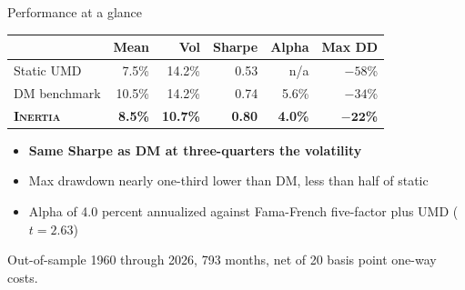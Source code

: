 \documentclass[aspectratio=169, 11pt]{beamer}
\newcommand{\fundname}{\textsc{Inertia}}
\newcommand{\emphb}[1]{{\color{inertiablue}\textbf{#1}}}
\begin{document}
\begin{frame}{Performance at a glance}
  \vspace{18pt}
  \begin{center}
  \small
  \begin{tabular}{l r r r r r}
    \toprule
     & \textbf{Mean} & \textbf{Vol} & \textbf{Sharpe} & \textbf{Alpha} & \textbf{Max DD} \\
    \midrule
    Static UMD    & 7.5\%  & 14.2\% & 0.53 & n/a    & $-58$\% \\
    DM benchmark  & 10.5\% & 14.2\% & 0.74 & 5.6\%  & $-34$\% \\
    \rowcolor{lightpurple}
    \textbf{\fundname}     & \textbf{8.5\%} & \textbf{10.7\%} & \textbf{0.80} & \textbf{4.0\%} & $\mathbf{-22}$\textbf{\%} \\
    \bottomrule
  \end{tabular}
  \end{center}
  \vspace{16pt}
  \begin{itemize}
    \item \emphb{Same Sharpe as DM at three-quarters the volatility}
    \item Max drawdown nearly one-third lower than DM, less than half of static
    \item Alpha of 4.0 percent annualized against Fama-French five-factor plus UMD ($t = 2.63$)
  \end{itemize}
  \vspace{4pt}
  {\footnotesize\color{gray} Out-of-sample 1960 through 2026, 793 months, net of 20 basis point one-way costs.}
\end{frame}
\end{document}
